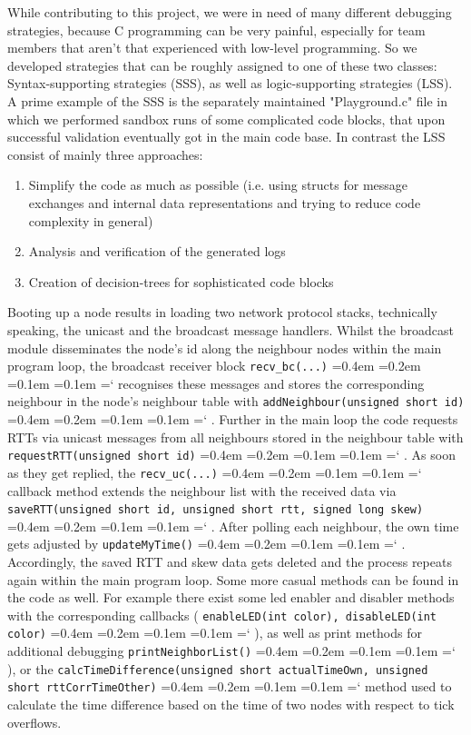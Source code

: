 \documentclass{llncs}
\newcommand{\code}[1]{%
	\texttt{#1}%
	\fontdimen2\font=0.4em
	\fontdimen3\font=0.2em
	\fontdimen4\font=0.1em
	\fontdimen7\font=0.1em
	\hyphenchar\font=`\-
}
\begin{document}
\noindent While contributing to this project, we were in need of many different debugging strategies, because C programming can be very painful, especially for team members that aren't that experienced with low-level programming.
So we developed strategies that can be roughly assigned to one of these two classes: Syntax-supporting strategies (SSS), as well as logic-supporting strategies (LSS). 
A prime example of the SSS is the separately maintained "Playground.c" file in which we performed sandbox runs of some complicated code blocks, that upon successful validation eventually got in the main code base.
In contrast the LSS consist of mainly three approaches:
\begin{enumerate}
\item Simplify the code as much as possible (i.e. using structs for message exchanges and internal data representations and trying to reduce code complexity in general)
\item Analysis and verification of the generated logs
\item Creation of decision-trees for sophisticated code blocks
\end{enumerate}
Booting up a node results in loading two network protocol stacks, technically speaking, the unicast and the broadcast message handlers. Whilst the broadcast module disseminates the node's id along the neighbour nodes within the main program loop, the broadcast receiver block \code{recv\_bc(...)} recognises these messages and stores the corresponding neighbour in the node's neighbour table with \code{addNeighbour(unsigned short id)}. Further in the main loop the code requests RTTs via unicast messages from all neighbours stored in the neighbour table with \code{requestRTT(unsigned short id)}. As soon as they get replied, the \code{recv\_uc(...)} callback method extends the neighbour list with the received data via \code{saveRTT(unsigned short id, unsigned short rtt, signed long skew)}.
After polling each neighbour, the own time gets adjusted by \code{updateMyTime()}. Accordingly, the saved RTT and skew data gets deleted and the process repeats again within the main program loop.
Some more casual methods can be found in the code as well. For example there exist some led enabler and disabler methods with the corresponding callbacks (\code{enableLED(int color), disableLED(int color)}), as well as print methods for additional debugging \code{print\-Neighbor\-List()}), or the \code{calcTimeDifference(unsigned short actualTimeOwn, un\-sign\-ed short rttCorrTimeOther)} method used to calculate the time difference based on the time of two nodes with respect to tick overflows.
\end{document}

